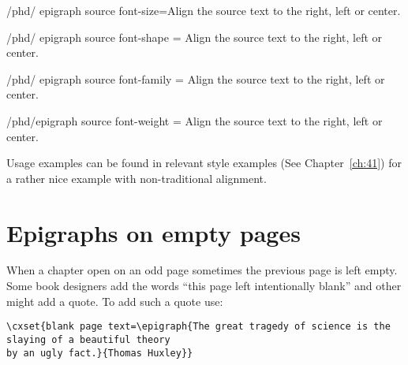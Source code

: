 \begin{key}{/phd/ epigraph source font-size=}Align the source text to the right, left or center.
\end{key}

\begin{key}{/phd/ epigraph source font-shape = }
Align the source text to the right, left or center.
\end{key}

\begin{key}{/phd/ epigraph source font-family = }Align the source text to the right, left or center.
\end{key}


\begin{key}{/phd/epigraph source font-weight = }
Align the source text to the right, left or center.
\end{key}


Usage examples can be found in relevant style examples (See Chapter~\ref{ch:41}) for a rather 
nice example with non-traditional alignment.

\section{Epigraphs on empty pages}

When a chapter open on an odd page sometimes the  previous page is left empty. Some book designers 
add the words ``this page left intentionally blank'' and other might add a quote. To add such a quote use:

\begin{tcolorbox}
\begin{lstlisting}
\cxset{blank page text=\epigraph{The great tragedy of science is the slaying of a beautiful theory
by an ugly fact.}{Thomas Huxley}}
\end{lstlisting}
\end{tcolorbox}
